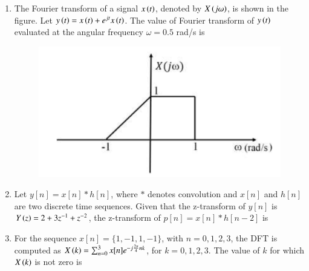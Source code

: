\documentclass[journal,12pt,onecolumn]{IEEEtran}
\theoremstyle{remark}
\begin{document}
\begin{enumerate}
    \item The Fourier transform of a signal $x\left(t\right)$, denoted by $X\left(j\omega\right)$, is shown in the figure. Let $y\left(t\right) = x\left(t\right) + e^{jt}x\left(t\right)$. The value of Fourier transform of $y\left(t\right)$ evaluated at the angular frequency $\omega= 0.5$ rad/s is
    \begin{figure}[H]
        \centering
        \includegraphics[width=0.5\columnwidth]{q33.png}
        \caption*{}
        \label{fig:q33}
    \end{figure}
    
    \hfill{}
    \begin{enumerate}
    \end{enumerate}

    \item Let $y[n] = x[n] * h[n]$, where $*$ denotes convolution and $x[n]$ and $h[n]$ are two discrete time sequences. Given that the z-transform of $y[n]$ is $Y\left(z\right) = 2 + 3z^{-1} + z^{-2}$, the z-transform of $p[n] = x[n] * h[n-2]$ is
    
    \hfill{}
    \begin{enumerate}
    \end{enumerate}
    
    \item For the sequence $x[n] = \{1, -1, 1, -1\}$, with $n = 0,1,2,3$, the DFT is computed as $X\left(k\right) = \sum_{n=0}^{3} x[n]e^{-j\frac{2\pi}{4}nk}$, for $k = 0,1,2,3$. The value of $k$ for which $X\left(k\right)$ is not zero is
    

\end{enumerate}
\end{document}
